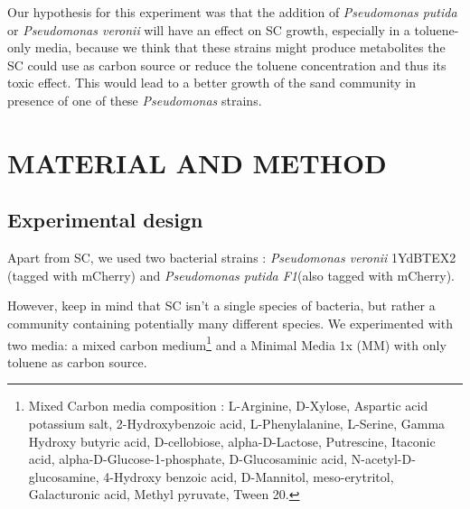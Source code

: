 \documentclass[a4paper, 10pt, conference]{ieeeconf}   %
\begin{document}



Our hypothesis for this experiment was that the addition of \textit{Pseudomonas putida} or \textit{Pseudomonas veronii} will have an effect on SC growth, especially in a toluene-only media, because we think that these strains might produce metabolites the SC could use as carbon source or reduce the toluene concentration and thus its toxic effect. This would lead to a better growth of the sand community in presence of one of these \textit{Pseudomonas} strains.


\section{MATERIAL AND METHOD}

\subsection{Experimental design}
Apart from SC, we used two bacterial strains : \textit{Pseudomonas veronii} 1YdBTEX2 (tagged with mCherry) and \textit{Pseudomonas putida F1}(also tagged with mCherry).

However, keep in mind that SC isn't a single species of bacteria, but rather a community containing potentially many different species.
We experimented with two media: a mixed carbon medium\footnote{Mixed Carbon media composition : L-Arginine, D-Xylose, Aspartic acid potassium salt, 2-Hydroxybenzoic acid, L-Phenylalanine, L-Serine, Gamma Hydroxy butyric acid, D-cellobiose, alpha-D-Lactose, Putrescine, Itaconic acid, alpha-D-Glucose-1-phosphate, D-Glucosaminic acid, N-acetyl-D-glucosamine, 4-Hydroxy benzoic acid, D-Mannitol, meso-erytritol, Galacturonic acid, Methyl pyruvate, Tween 20.} and a Minimal Media 1x (MM) with only toluene as carbon source.
\end{document}

